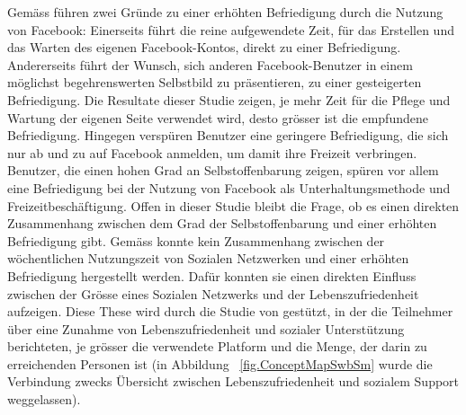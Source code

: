 Gemäss  führen zwei Gründe zu einer erhöhten Befriedigung durch die Nutzung von Facebook: Einerseits führt die reine aufgewendete Zeit, für das Erstellen und das Warten des eigenen Facebook-Kontos, direkt zu einer Befriedigung. Andererseits führt der Wunsch, sich anderen Facebook-Benutzer in einem möglichst begehrenswerten Selbstbild zu präsentieren, zu einer gesteigerten Befriedigung. Die Resultate dieser Studie zeigen, je mehr Zeit für die Pflege und Wartung der eigenen Seite verwendet wird, desto grösser ist die empfundene Befriedigung. Hingegen verspüren Benutzer eine geringere Befriedigung, die sich nur ab und zu auf Facebook anmelden, um damit ihre Freizeit verbringen. \newline
Benutzer, die einen hohen Grad an Selbstoffenbarung zeigen, spüren vor allem eine Befriedigung bei der Nutzung von Facebook als Unterhaltungsmethode und Freizeitbeschäftigung. Offen in dieser Studie bleibt die Frage, ob es einen direkten Zusammenhang zwischen dem Grad der Selbstoffenbarung und einer erhöhten Befriedigung gibt.\newline
Gemäss  konnte kein Zusammenhang zwischen der wöchentlichen Nutzungszeit von Sozialen Netzwerken und einer erhöhten Befriedigung hergestellt werden. Dafür konnten sie einen direkten Einfluss zwischen der Grösse eines Sozialen Netzwerks und der Lebenszufriedenheit aufzeigen. Diese These wird durch die Studie von  gestützt, in der die Teilnehmer über eine Zunahme von Lebenszufriedenheit und sozialer Unterstützung berichteten, je grösser die verwendete Platform und die Menge, der darin zu erreichenden Personen ist (in Abbildung ~\ref{fig.ConceptMapSwbSm} wurde die Verbindung zwecks Übersicht zwischen Lebenszufriedenheit und sozialem Support weggelassen). 

